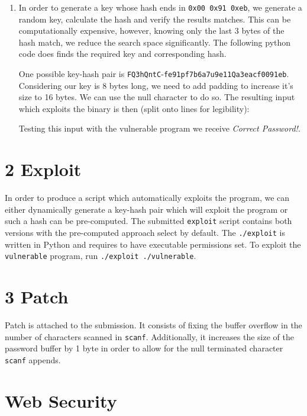 \documentclass[a4paper, 12pt]{article}
\begin{document}
\begin{enumerate}
    \item In order to generate a key whose hash ends in \texttt{0x00 0x91 0xeb}, we generate a random key, calculate the hash and verify the results matches. This can be computationally expensive, however, knowing only the last 3 bytes of the hash match, we reduce the search space significantly. The following python code does finds the required key and corresponding hash.
    
    
    One possible key-hash pair is \texttt{FQ3hQntC}-\texttt{fe91pf7b6a7u9e11Qa3eacf0091eb}. Considering our key is 8 bytes long, we need to add padding to increase it's size to 16 bytes. We can use the null character to do so. The resulting input  which exploits the binary is then (split onto lines for legibility):
        
        
    Testing this input with the vulnerable program we receive \textit{Correct Password!}.
    
\end{enumerate}

\section*{2 Exploit}
In order to produce a script which automatically exploits the program, we can either dynamically generate a key-hash pair which will exploit the program or such a hash can be pre-computed. The submitted \texttt{exploit} script contains both versions with the pre-computed approach select by default. The \texttt{./exploit} is written in Python and requires to have executable permissions set. To exploit the \texttt{vulnerable} program, run \texttt{./exploit ./vulnerable}.

\section*{3 Patch}
Patch is attached to the submission. It consists of fixing the buffer overflow in the number of characters scanned in \texttt{scanf}. Additionally, it increases the size of the password buffer by 1 byte in order to allow for the null terminated character \texttt{scanf} appends.


\newpage
\section*{Web Security}
\setcounter{section}{1}
\end{document}
